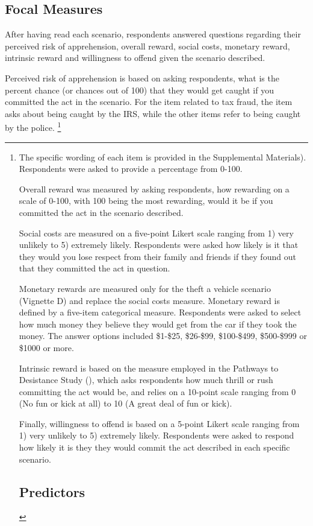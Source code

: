 \documentclass{article} %
\begin{document}
\begin{enumerate}[A]
\subsection{Focal Measures}

After having read each scenario, respondents answered questions regarding their perceived risk of apprehension, overall reward, social costs, monetary reward, intrinsic reward and willingness to offend given the scenario described. 

Perceived risk of apprehension is based on asking respondents, what is the percent chance (or chances out of 100) that they would get caught if you committed the act in the scenario. For the item related to tax fraud, the item asks about being caught by the IRS, while the other items refer to being caught by the police. \footnote{The specific wording of each item is provided in the Supplemental Materials). Respondents were asked to provide a percentage from 0-100. 

Overall reward was measured by asking respondents, how rewarding on a scale of 0-100, with 100 being the most rewarding, would it be if you committed the act in the scenario described. 

Social costs are measured on a five-point Likert scale ranging from 1) very unlikely to 5) extremely likely. Respondents were asked how likely is it that they would you lose respect from their family and friends if they found out that they committed the act in question.

Monetary rewards are measured only for the theft a vehicle scenario (Vignette D) and replace the social costs measure. Monetary reward is defined by a five-item categorical measure. Respondents were asked to select how much money they believe they would get from the car if they took the money. The answer options included \$1-\$25, \$26-\$99, \$100-\$499, \$500-\$999 or \$1000 or more. 

Intrinsic reward is based on the measure employed in the Pathways to Desistance Study (), which asks respondents how much thrill or rush committing the act would be, and relies on a 10-point scale ranging from 0 (No fun or kick at all) to 10 (A great deal of fun or kick). 

Finally, willingness to offend is based on a 5-point Likert scale ranging from 1) very unlikely to 5) extremely likely. Respondents were asked to respond how likely it is they they would commit the act described in each specific scenario. 


\subsection{Predictors}

}
\end{enumerate}
\end{document}
